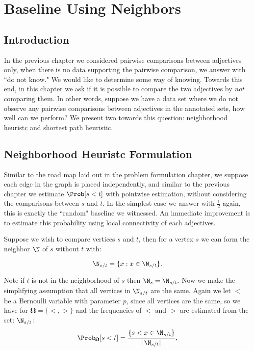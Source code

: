 \section{Baseline Using Neighbors}

\subsection{Introduction}

In the previous chapter we considered pairwise comparisons between adjectives only, when there is no data supporting the pairwise comparison, we answer with ``do not know."  We would like to determine some way of knowing. Towards this end, in this chapter we ask if it is possible to compare the two adjectives by \textit{not} comparing them. In other words, suppose we have a data set where we do not observe any pairwise comparisons between adjectives in the annotated sets, how well can we perform? We present two  towards this question: neighborhood heuristc and shortest path heuristic.

\subsection{Neighborhood Heuristc Formulation}

Similar to the road map laid out in the problem formulation chapter, we suppose each edge in the graph is placed independently, and similar to the previous chapter we estimate $\Prob[ s < t ]$ with pointwise estimation, without considering the comparisons between $s$ and $t$. In the simplest case we answer with $\frac{1}{2}$ again, this is exactly the ``random" baseline we witnessed. An immediate improvement is to estimate this probability using local connectivity of each adjectives. 

Suppose we wish to compare vertices $s$ and $t$, then for a vertex $s$ we can form the neighbor $\N$ of $s$ without $t$ with:

	\[
		\N_{s/t} = \{ x : x \in \N_{s/t}\}.
	\]

Note if $t$ is not in the neighborhood of $s$ then $\N_s = \N_{s/t}.$ Now we make the simplifying assumption that all vertices in $\N_{s/t}$ are the same. Again we let $<$ be a Bernoulli variable with parameter $p$, since all vertices are the same, so we have for $\pmb{\Omega} = \{<,>\}$ and the frequencies of $<$ and $>$ are estimated from the set: $\N_{s/t}$:
	\[
		\Prob_{\pmb{\Omega}}[s < t] = \frac{\{ s < x \in \N_{s/t}\}}{|\N_{s/t}|},
	\]

